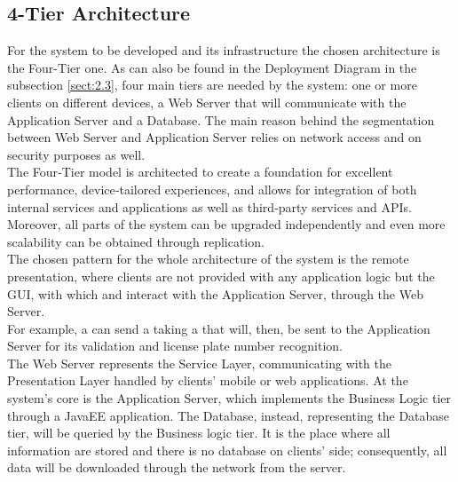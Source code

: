 \documentclass[../../../DD.tex]{subfiles}
\begin{document}
	
	\subsection{4-Tier Architecture\label{subsect:2.6.1}}
	For the system to be developed and its infrastructure the chosen architecture is the Four-Tier one. As can also be found in the Deployment Diagram in the subsection \ref{sect:2.3}, four main tiers are needed by the system: one or more clients on different devices, a Web Server that will communicate with the Application Server and a Database. The main reason behind the segmentation between Web Server and Application Server relies on network access and on security purposes as well.\\
	The Four‑Tier model is architected to create a foundation for excellent performance, device‑tailored experiences, and allows for integration of both internal services and applications as well as third‑party services and APIs. Moreover, all parts of the system can be upgraded independently and even more scalability can be obtained through replication. \\
	
	The chosen pattern for the whole architecture of the system is the remote presentation, where clients are not provided with any application logic but the GUI, with which  and  interact with the Application Server, through the Web Server. \\
	For example, a  can send a  taking a  that will, then, be sent to the Application Server for its validation and license plate number recognition. \\
	
	The Web Server represents the Service Layer, communicating with the Presentation Layer handled by clients' mobile or web applications. At the system's core is the Application Server, which implements the Business Logic tier through a JavaEE application. The Database, instead, representing the Database tier, will be queried by the Business logic tier. It is the place where all information are stored and there is no database on clients' side; consequently, all data will be downloaded through the network from the server.
	
\end{document}
